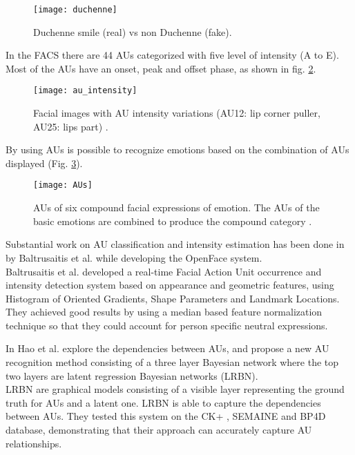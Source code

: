 \begin{figure}[H]
	\centering
	\texttt{[image: duchenne]}
	\caption{Duchenne smile (real) vs non Duchenne (fake).}
	\label{fig:duchenne}
\end{figure}

In the FACS there are 44 AUs categorized with five level of intensity (A to E). Most of the AUs have an onset, peak and offset phase, as shown in fig. \ref{fig:au_intensity}. 

\begin{figure}[H]
	\centering
	\texttt{[image: au\_intensity]}
	\caption{Facial images with AU intensity variations (AU12: lip corner puller, AU25: lips part) \cite{DISFA}.}
	\label{fig:au_intensity}
\end{figure}

By using AUs is possible to recognize emotions based on the combination of AUs displayed (Fig. \ref{fig:AUs}).

\begin{figure}[H]
	\centering
	\texttt{[image: AUs]}
	\caption{AUs of six compound facial expressions of emotion. The AUs of the basic emotions are combined to produce the compound category \cite{Du2014CompoundFE}.}
	\label{fig:AUs}
\end{figure}

Substantial work on AU classification and intensity estimation has been done in \cite{Baltru2015} by Baltrusaitis et al. while developing the OpenFace \cite{Baltru2016} system. \\
Baltrusaitis et al. developed a real-time Facial Action Unit occurrence and intensity detection system based on appearance and geometric features, using Histogram of Oriented Gradients, Shape Parameters and Landmark Locations. They achieved good results by using a median based feature normalization technique so that they could account for person specific neutral expressions.

In \cite{HaoWangAU} Hao et al. explore the dependencies between AUs, and propose a new AU recognition method consisting of a three layer Bayesian network where the top two layers are latent regression Bayesian networks (LRBN). \\
LRBN are graphical models consisting of a visible layer representing the ground truth for AUs and a latent one. LRBN is able to capture the dependencies between AUs. They tested this system on the CK+ \cite{CK+}, SEMAINE \cite{SEMAINE} and BP4D \cite{BP4D-Spontaneous} database, demonstrating that their approach can accurately capture AU relationships.

